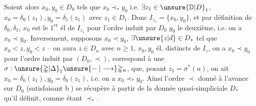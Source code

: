 Soient alors $x_0,y_0\in D_0$ tels que $x_0\prec_{*}y_0$ i.e. $\exists z_1\in\unsure{\mathbb D|D}_1$, $x_0=\delta_0(z_1),y_0=\delta_1(z_1)$ avec $z_1\in D_1$. Donc $I_{z_1}=\{x_0,y_0\}$, et par définition de $\delta_0,\delta_1$, $x_0$ est
le $\mathrm{1}^{\mathrm{er}}$ él de $I_{z_1}$ pour l'ordre  induit par $D_0$ $y_0$ le deuxième, i.e. on a $x_0\prec y_0$. Inversement,
supposons $x_0\prec y_0$,  $\exists\unsure{z|d}\in D_*$ tel que $x_0<z,y_0<z$ -- on aura $z\in D_n$ avec $n\geq1$, $x_0,y_0$ él. distincts de $I_z$,  on a $x_0\prec y_0$ pour
l'ordre induit par $(D_0,\prec)$,  correspond à une   $\sigma:\unsure{\mathbb{\Delta}|\Delta}_1\unsure{\mathrel{-}|\longrightarrow}\mathbb{\Delta}_n$,  que, posant $z_1=\sigma^*(u)$, on ait $x_0=\delta_0(z_1),y_0=\delta_0(z_1)$, i.e. on
a $x_0\prec_*y_0$. Ainsi l'ordre $\prec$ donné à l'avance sur $D_0$ (satisfaisant \textcircled{b}) se récupère à partir de la donnée quasi-simpliciale $D_*$ qu'il définit, comme étant $\prec_*$.


